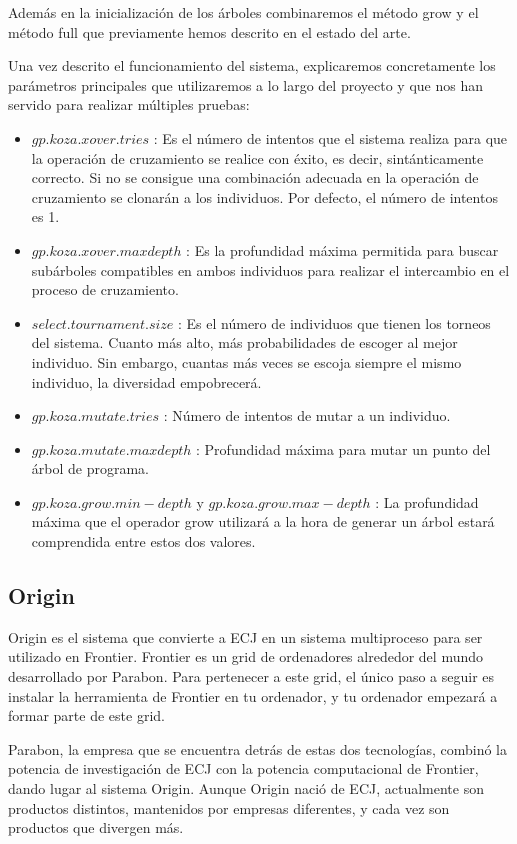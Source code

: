 Además en la inicialización de los árboles combinaremos el método grow y el
método full que previamente hemos descrito en el estado del arte.

Una vez descrito el funcionamiento del sistema, explicaremos concretamente los
parámetros principales que utilizaremos a lo largo del proyecto y que nos han
servido para realizar múltiples pruebas:

\begin{itemize}
\item $gp.koza.xover.tries$ : Es el número de intentos que el sistema realiza
para que la operación de cruzamiento se realice con éxito, es decir, sintánticamente correcto. Si no se consigue una combinación adecuada en la operación de cruzamiento se clonarán a los individuos. Por defecto, el número de intentos es 1.
\item $gp.koza.xover.maxdepth$ : Es la profundidad máxima permitida para buscar
subárboles compatibles en ambos individuos para realizar el intercambio en el proceso de cruzamiento. 
\item $select.tournament.size$ : Es el número de individuos que tienen los
torneos del sistema. Cuanto más alto, más probabilidades de escoger al mejor individuo. Sin embargo, cuantas más veces se escoja siempre el mismo individuo, la diversidad empobrecerá.
\item $gp.koza.mutate.tries$ : Número de intentos de mutar a un individuo.
\item $gp.koza.mutate.maxdepth$ : Profundidad máxima para mutar un punto del
árbol de programa. 
\item $gp.koza.grow.min-depth$ y $gp.koza.grow.max-depth$ : La
profundidad máxima que el operador grow utilizará a la hora de generar un árbol estará comprendida entre estos dos valores.
\end{itemize}

\subsection{Origin}\label{subsec:origin}


Origin es el sistema que convierte a ECJ en un sistema multiproceso para ser
utilizado en Frontier. Frontier es un grid de ordenadores alrededor del mundo
desarrollado por Parabon. Para pertenecer a este grid, el único paso a seguir es
instalar la herramienta de Frontier en tu ordenador, y tu ordenador empezará a
formar parte de este grid.

Parabon, la empresa que se encuentra detrás de estas dos tecnologías, combinó la
potencia de investigación de ECJ con la potencia computacional de Frontier, dando
lugar al sistema Origin. Aunque Origin nació de ECJ, actualmente son productos
distintos, mantenidos por empresas diferentes, y cada vez son productos que
divergen más.


